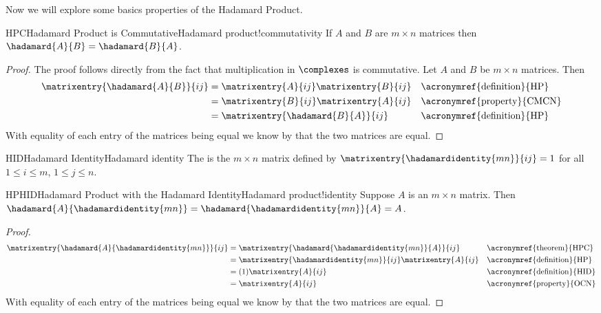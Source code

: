 %
Now we will explore some basics properties of the Hadamard Product.
%
\begin{theorem}{HPC}{Hadamard Product is Commutative}{Hadamard product!commutativity} 
If $A$ and $B$ are $m \times n$ matrices then $\hadamard{A}{B} = \hadamard{B}{A}$.
\end{theorem}
%
\begin{proof}
The proof follows directly from the fact that multiplication in $\complexes$ is commutative. Let $A$ and $B$ be $m \times n$ matrices. Then 
%
\begin{align*}
\matrixentry{\hadamard{A}{B}}{ij} 
&= \matrixentry{A}{ij}\matrixentry{B}{ij} 
&& \text{\acronymref{definition}{HP}} \\
%
&= \matrixentry{B}{ij}\matrixentry{A}{ij} 
&& \text{\acronymref{property}{CMCN}} \\
%
&= \matrixentry{\hadamard{B}{A}}{ij} 
&& \text{\acronymref{definition}{HP}} 
\end{align*}
With equality of each entry of the matrices being equal we know by  that the two matrices are equal.
\end{proof}
%
\begin{definition}{HID}{Hadamard Identity}{Hadamard identity}
The  is the $m \times n$ matrix  defined by $\matrixentry{\hadamardidentity{mn}}{ij} = 1$ for all $1 \leq i \leq m$, $1 \leq j \leq n$.
%
\end{definition}
%
\begin{theorem}{HPHID}{Hadamard Product with the Hadamard Identity}{Hadamard product!identity} 
Suppose $A$ is an $m \times n$ matrix. Then $\hadamard{A}{\hadamardidentity{mn}} = \hadamard{\hadamardidentity{mn}}{A} = A$.
\end{theorem}
\begin{proof}
\begin{align*}
\matrixentry{\hadamard{A}{\hadamardidentity{mn}}}{ij} 
&= \matrixentry{\hadamard{\hadamardidentity{mn}}{A}}{ij} 
&& \text{\acronymref{theorem}{HPC}} \\
%
&= \matrixentry{\hadamardidentity{mn}}{ij}\matrixentry{A}{ij} 
&& \text{\acronymref{definition}{HP}} \\
%
&= (1) \matrixentry{A}{ij} 
&& \text{\acronymref{definition}{HID}} \\
%
&= \matrixentry{A}{ij} 
&& \text{\acronymref{property}{OCN}} 
\end{align*}
With equality of each entry of the matrices being equal we know by  that the two matrices are equal.
\end{proof}
